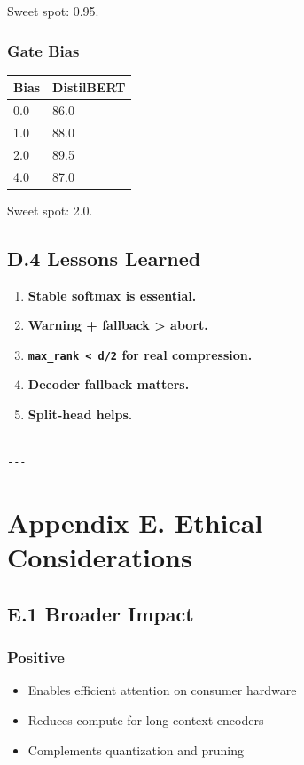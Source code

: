 Sweet spot: 0.95.

\subsubsection{Gate Bias}

\begin{table}[H]
\centering
\small
\begin{tabular}{ll}
\toprule
\textbf{Bias} & \textbf{DistilBERT} \\
\midrule
0.0 & 86.0 \\
1.0 & 88.0 \\
2.0 & 89.5 \\
4.0 & 87.0 \\
\bottomrule
\end{tabular}
\end{table}

Sweet spot: 2.0.

\subsection{D.4 Lessons Learned}

\begin{enumerate}
\item \textbf{Stable softmax is essential.}
\item \textbf{Warning + fallback > abort.}
\item \textbf{\texttt{max\_rank < d/2} for real compression.}
\item \textbf{Decoder fallback matters.}
\item \textbf{Split-head helps.}
\end{enumerate}
\begin{lstlisting}

---
\end{lstlisting}

\section{Appendix E. Ethical Considerations}

\subsection{E.1 Broader Impact}

\subsubsection{Positive}
\begin{itemize}
\item Enables efficient attention on consumer hardware
\item Reduces compute for long-context encoders
\item Complements quantization and pruning

\end{itemize}
